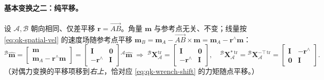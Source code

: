 \paragraph{基本变换之二：纯平移。}
设 $\mathcal{A},\mathcal{B}$ 朝向相同、仅差平移 $\boldsymbol{r}=\overrightarrow{AB}$。角量 $\boldsymbol{m}$ 与参考点无关、不变；线量按 \cref{eq:qk-spatial-vel} 的速度场随参考点平移 $\boldsymbol{m}_B=\boldsymbol{m}_A-\overrightarrow{AB}\times\boldsymbol{m}=\boldsymbol{m}_A-\boldsymbol{r}^{\wedge}\boldsymbol{m}$\cite{yu2021quadruped}：
\begin{equation}
  {}^{\mathcal{B}}\hat{\boldsymbol{m}}
  =\begin{bmatrix}\boldsymbol{m}\\ \boldsymbol{m}_A-\boldsymbol{r}^{\wedge}\boldsymbol{m}\end{bmatrix}
  =\begin{bmatrix}\mathbf{I}&\mathbf{0}\\-\boldsymbol{r}^{\wedge}&\mathbf{I}\end{bmatrix}{}^{\mathcal{A}}\hat{\boldsymbol{m}}
  \;\Rightarrow\;
  {}^{\mathcal{B}}\mathbf{X}_{\mathcal{A}}^{\text{tr}}=\begin{bmatrix}\mathbf{I}&\mathbf{0}\\-\boldsymbol{r}^{\wedge}&\mathbf{I}\end{bmatrix},
  \quad
  {}^{\mathcal{B}}\mathbf{X}_{\mathcal{A}}^{*\,\text{tr}}={}^{\mathcal{B}}\mathbf{X}_{\mathcal{A}}^{-\top\,\text{tr}}=\begin{bmatrix}\mathbf{I}&-\boldsymbol{r}^{\wedge}\\\mathbf{0}&\mathbf{I}\end{bmatrix}.
  \label{eq:qk-plucker-tr}
\end{equation}
（对偶力变换的平移项移到\emph{右上}，恰对应 \cref{eq:qk-wrench-shift} 的力矩随点平移。）

